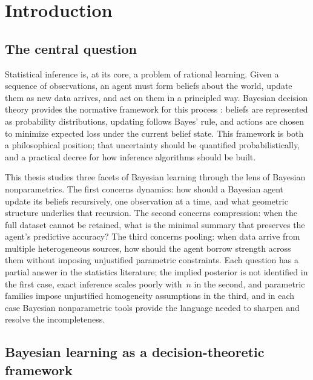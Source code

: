 \chapter{Introduction}

\section{The central question}
\label{sec:intro:central}

Statistical inference is, at its core, a problem of rational learning.
Given a sequence of observations, an agent must form beliefs about the
world, update them as new data arrives, and act on them in a principled
way.  Bayesian decision theory provides the normative framework for this
process \citep{Wald1950, Savage1954, Berger1985}: beliefs are represented
as probability distributions, updating follows Bayes' rule, and actions
are chosen to minimize expected loss under the current belief state.  This
framework is both a philosophical position; that uncertainty should be
quantified probabilistically, and a practical decree for how
inference algorithms should be built.

This thesis studies three facets of Bayesian learning through the lens of
Bayesian nonparametrics.  The first concerns dynamics: how should a
Bayesian agent update its beliefs recursively, one observation at a time,
and what geometric structure underlies that recursion. The second concerns compression: when the full dataset cannot be retained, what is the
minimal summary that preserves the agent's predictive accuracy?  The third
concerns pooling: when data arrive from multiple heterogeneous
sources, how should the agent borrow strength across them without imposing
unjustified parametric constraints.  Each question has a partial answer
in the statistics literature; the implied
posterior is not identified in the first case, exact inference scales
poorly with~$n$ in the second, and parametric families impose unjustified
homogeneity assumptions in the third, and in each case Bayesian
nonparametric tools provide the language needed to sharpen and resolve the
incompleteness.

\section{Bayesian learning as a decision-theoretic framework}
\label{sec:intro:framework}

